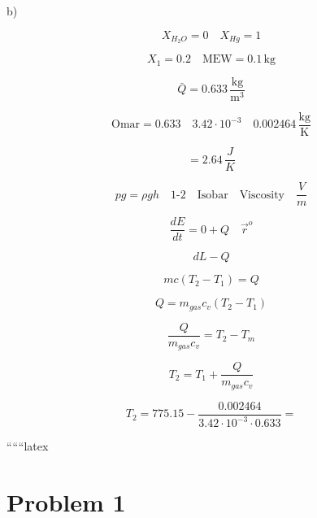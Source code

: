 b)

\[
X_{H_2O} = 0 \quad X_{Hg} = 1
\]

\[
X_1 = 0.2 \quad \text{MEW} = 0.1 \, \text{kg}
\]

\[
\bar{Q} = 0.633 \, \frac{\text{kg}}{\text{m}^3}
\]

\[
\text{Omar} = 0.633 \quad 3.42 \cdot 10^{-3} \quad 0.002464 \, \frac{\text{kg}}{\text{K}}
\]

\[
= 2.64 \, \frac{J}{K}
\]

\[
p g = \rho g h \quad \text{1-2} \quad \text{Isobar} \quad \text{Viscosity} \quad \frac{V}{m}
\]

\[
\frac{dE}{dt} = 0 + Q \quad \vec{r}^o
\]

\[
dL - Q
\]

\[
m c (T_2 - T_1) = Q
\]

\[
Q = m_{gas} c_v (T_2 - T_1)
\]

\[
\frac{Q}{m_{gas} c_v} = T_2 - T_m
\]

\[
T_2 = T_1 + \frac{Q}{m_{gas} c_v}
\]

\[
T_2 = 775.15 - \frac{0.002464}{3.42 \cdot 10^{-3} \cdot 0.633} =
\]

``````latex

\section*{Problem 1}